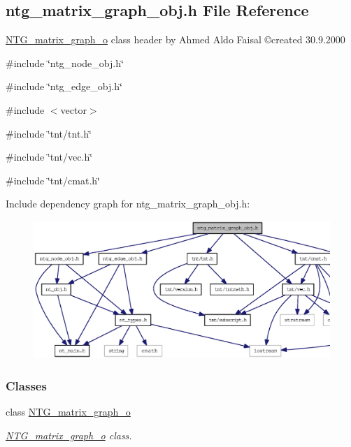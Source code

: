 \subsection{ntg\_\-matrix\_\-graph\_\-obj.h File Reference}
\label{ntg__matrix__graph__obj_8h}



\begin{DoxyItemize}
\item \hyperlink{class_n_t_g__matrix__graph__o}{NTG\_\-matrix\_\-graph\_\-o} class header by Ahmed Aldo Faisal \copyright created 30.9.2000 
\end{DoxyItemize} 


{\ttfamily \#include \char`\"{}ntg\_\-node\_\-obj.h\char`\"{}}\par
{\ttfamily \#include \char`\"{}ntg\_\-edge\_\-obj.h\char`\"{}}\par
{\ttfamily \#include $<$vector$>$}\par
{\ttfamily \#include \char`\"{}tnt/tnt.h\char`\"{}}\par
{\ttfamily \#include \char`\"{}tnt/vec.h\char`\"{}}\par
{\ttfamily \#include \char`\"{}tnt/cmat.h\char`\"{}}\par
Include dependency graph for ntg\_\-matrix\_\-graph\_\-obj.h:
\nopagebreak
\begin{figure}[H]
\begin{center}
\leavevmode
\includegraphics[width=400pt]{ntg__matrix__graph__obj_8h__incl}
\end{center}
\end{figure}
\subsubsection*{Classes}
\begin{DoxyCompactItemize}
\item 
class \hyperlink{class_n_t_g__matrix__graph__o}{NTG\_\-matrix\_\-graph\_\-o}
\begin{DoxyCompactList}\small\item\em \hyperlink{class_n_t_g__matrix__graph__o}{NTG\_\-matrix\_\-graph\_\-o} class. \item\end{DoxyCompactList}\end{DoxyCompactItemize}
